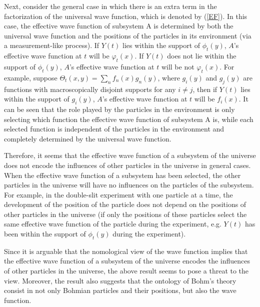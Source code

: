 Next, consider the general case in which there is an extra term in the factorization of the universal wave function, which is denoted by (\ref{EF}). In this case, the effective wave function of subsystem A is determined by both the universal wave function and the positions of the particles in its environment (via a measurement-like process). If $Y(t)$ lies within the support of $\phi_t(y)$, $A$'s effective wave function at $t$ will be $\varphi_t(x)$. If $Y(t)$ does not lie within the support of $\phi_t(y)$, $A$'s effective wave function at $t$ will be not $\varphi_t(x)$. For example, suppose $\Theta_t(x, y)=\sum_n{f_n(x)g_n(y)}$, where $g_i(y)$ and $g_j(y)$ are functions with macroscopically disjoint supports for any $i \neq j$, then if $Y(t)$ lies within the support of $g_i(y)$, $A$'s effective wave function at $t$ will be $f_i(x)$. 
It can be seen that the role played by the particles in the environment is only selecting which function the effective wave function of subsystem A is, while each selected function is independent of the particles in the environment and completely determined by the universal wave function. 

Therefore, it seems that the effective wave function of a subsystem of the universe does not encode the influences of other particles in the universe  in general cases. When the effective wave function of a subsystem has been selected, the other particles in the universe will have no influences on the particles of the subsystem. For example, in the double-slit experiment with one particle at a time, the development of the position of the particle does not depend on the positions of other particles in the universe (if only the positions of these particles select the same effective wave function of the particle during the experiment, e.g. $Y(t)$ has been within the support of $\phi_t(y)$ during the experiment).

Since it is arguable that the nomological view of the wave function implies that the effective wave function of a subsystem of the universe encodes the influences of other particles in the universe, the above result seems to pose a threat to the view. Moreover, the result also suggests that the ontology of Bohm's theory consist in not only Bohmian particles and their positions, but also the wave function.

